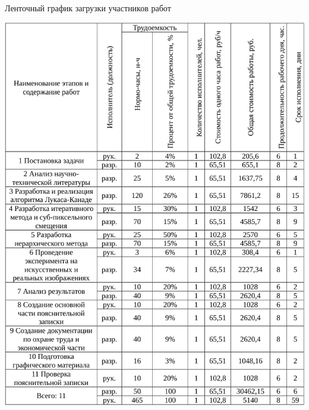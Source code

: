\begin{table}[!ht]
\caption{Ленточный график загрузки участников работ}
\centering
\includegraphics[page=2, width=1\linewidth]{econom_table.pdf}
\label{tab:eco_2}
\end{table}

